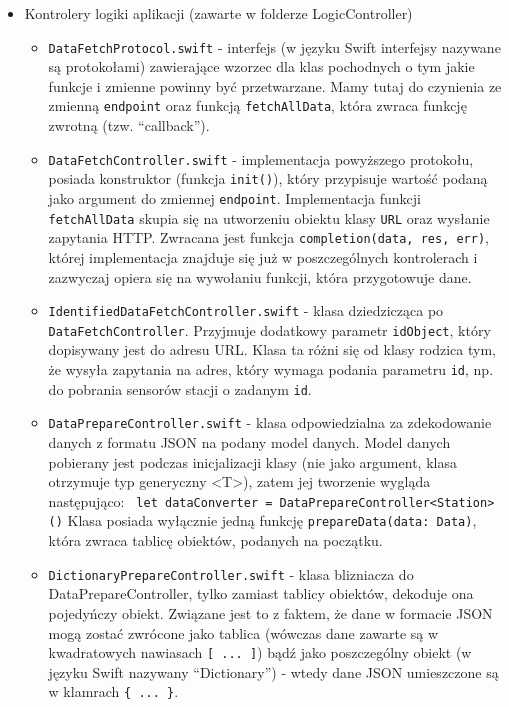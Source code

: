 \documentclass[a4paper,11pt,titlepage]{article}
\begin{document}
\begin{itemize}
	\item Kontrolery logiki aplikacji (zawarte w folderze LogicController)
	\begin{itemize}
		\item \verb|DataFetchProtocol.swift| - interfejs (w języku Swift interfejsy nazywane są protokołami) zawierające wzorzec dla klas pochodnych o tym jakie funkcje i zmienne powinny być przetwarzane. Mamy tutaj do czynienia ze zmienną \verb|endpoint| oraz funkcją \verb|fetchAllData|, która zwraca funkcję zwrotną (tzw. ``callback'').
		\item \verb|DataFetchController.swift| - implementacja powyższego protokołu, posiada konstruktor (funkcja \verb|init()|), który przypisuje wartość podaną jako argument do zmiennej \verb|endpoint|. Implementacja funkcji \verb|fetchAllData| skupia się na utworzeniu obiektu klasy \verb|URL| oraz wysłanie zapytania HTTP. Zwracana jest funkcja \verb|completion(data, res, err)|, której implementacja znajduje się już w poszczególnych kontrolerach i zazwyczaj opiera się na wywołaniu funkcji, która przygotowuje dane.
		\item \verb|IdentifiedDataFetchController.swift| - klasa dziedzicząca po \verb|DataFetchController|. Przyjmuje dodatkowy parametr \verb|idObject|, który dopisywany jest do adresu URL. Klasa ta różni się od klasy rodzica tym, że wysyła zapytania na adres, który wymaga podania parametru \verb|id|, np. do pobrania sensorów stacji o zadanym \verb|id|.
		\item \verb|DataPrepareController.swift| - klasa odpowiedzialna za zdekodowanie danych z formatu JSON na podany model danych. Model danych pobierany jest podczas inicjalizacji klasy (nie jako argument, klasa otrzymuje typ generyczny <T>), zatem jej tworzenie wygląda następująco: \newline \verb| let dataConverter = DataPrepareController<Station>()| \newline Klasa posiada wyłącznie jedną funkcję \verb|prepareData(data: Data)|, która zwraca tablicę obiektów, podanych na początku.
		\item \verb|DictionaryPrepareController.swift| - klasa blizniacza do DataPrepareController, tylko zamiast tablicy obiektów, dekoduje ona pojedyńczy obiekt. Związane jest to z faktem, że dane w formacie JSON mogą zostać zwrócone jako tablica (wówczas dane zawarte są w kwadratowych nawiasach \verb|[ ... ]|) bądź jako poszczególny obiekt (w języku Swift nazywany ``Dictionary'') - wtedy dane JSON umieszczone są w klamrach \verb|{ ... }|.
	\end{itemize}


\end{itemize}
\end{document}
